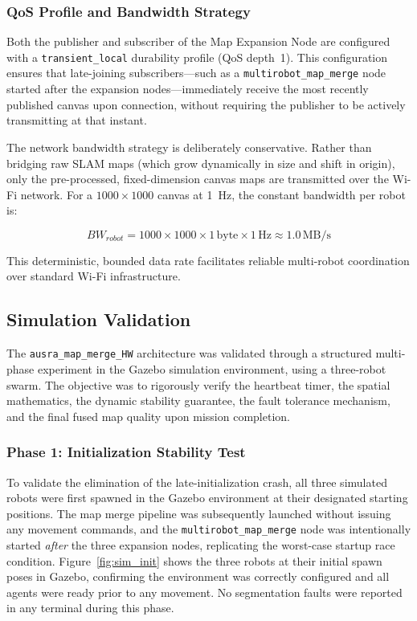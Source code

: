 \documentclass{article}
\begin{document}
\subsubsection{QoS Profile and Bandwidth Strategy}

Both the publisher and subscriber of the Map Expansion Node are configured with a \texttt{transient\_local} durability profile (QoS depth~1). This configuration ensures that late-joining subscribers—such as a \texttt{multirobot\_map\_merge} node started after the expansion nodes—immediately receive the most recently published canvas upon connection, without requiring the publisher to be actively transmitting at that instant.

The network bandwidth strategy is deliberately conservative. Rather than bridging raw SLAM maps (which grow dynamically in size and shift in origin), only the pre-processed, fixed-dimension canvas maps are transmitted over the Wi-Fi network. For a $1000 \times 1000$ canvas at 1~Hz, the constant bandwidth per robot is:

\begin{equation}
    BW_{robot} = 1000 \times 1000 \times 1\,\text{byte} \times 1\,\text{Hz} \approx 1.0\,\text{MB/s}
    \label{eq:bandwidth}
\end{equation}

This deterministic, bounded data rate facilitates reliable multi-robot coordination over standard Wi-Fi infrastructure.

\subsection{Simulation Validation}
\label{subsec:map_merge_sim_validation}

The \texttt{ausra\_map\_merge\_HW} architecture was validated through a structured multi-phase experiment in the Gazebo simulation environment, using a three-robot swarm. The objective was to rigorously verify the heartbeat timer, the spatial mathematics, the dynamic stability guarantee, the fault tolerance mechanism, and the final fused map quality upon mission completion.

\subsubsection{Phase 1: Initialization Stability Test}

To validate the elimination of the late-initialization crash, all three simulated robots were first spawned in the Gazebo environment at their designated starting positions. The map merge pipeline was subsequently launched without issuing any movement commands, and the \texttt{multirobot\_map\_merge} node was intentionally started \emph{after} the three expansion nodes, replicating the worst-case startup race condition. Figure~\ref{fig:sim_init} shows the three robots at their initial spawn poses in Gazebo, confirming the environment was correctly configured and all agents were ready prior to any movement. No segmentation faults were reported in any terminal during this phase.
\end{document}
